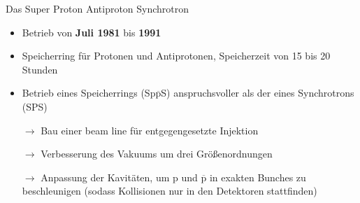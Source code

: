 \documentclass[aspectratio=1610, professionalfonts, 10pt]{beamer}
\begin{document}
\begin{frame}{Das Super Proton Antiproton Synchrotron}
				\begin{itemize}
					\setlength\itemsep{0.5em}
					\item Betrieb von \textbf{Juli 1981} bis \textbf{1991}
					\item Speicherring für Protonen und Antiprotonen, Speicherzeit von 15 bis 20 Stunden
					\item Betrieb eines Speicherrings (Sp$\overline{\text{p}}$S) anspruchsvoller als der eines Synchrotrons (SPS)
					\item[$\rightarrow$] Bau einer beam line für entgegengesetzte Injektion
					\item[$\rightarrow$] Verbesserung des Vakuums um drei Grö{\ss}enordnungen
					\item[$\rightarrow$] Anpassung der Kavitäten, um p und $\overline{\text{p}}$ in exakten Bunches zu beschleunigen (sodass Kollisionen nur in den Detektoren stattfinden)
				\end{itemize}
\end{frame}
\end{document}
